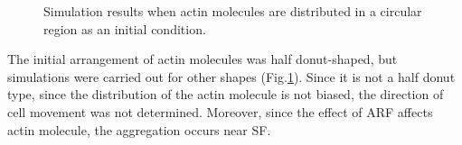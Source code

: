\documentclass[a4paper,12pt, oneside]{book}
\begin{document}
\begin{figure}[tbp]
 \caption{Simulation results when actin molecules are distributed in a circular region as an initial condition.}
 \label{fig:res4}
\end{figure}


The initial arrangement of actin molecules was half donut-shaped, but simulations were carried out for other shapes (Fig.\ref{fig:res4}). Since it is not a half donut type, since the distribution of the actin molecule is not biased, the direction of cell movement was not determined. Moreover, since the effect of ARF affects actin molecule, the aggregation occurs near SF.
\end{document}
